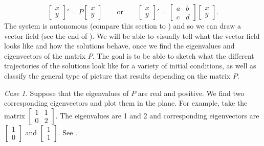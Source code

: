 \documentclass{ximera}
\begin{document}
\begin{equation} \label{pln:eq}
    \begin{bmatrix} 
        x \\ 
        y 
    \end{bmatrix} 
    ' = P 
    \begin{bmatrix} 
        x \\ 
        y 
    \end{bmatrix} 
    \qquad \text{or} \qquad
    \begin{bmatrix} 
        x \\ 
        y 
    \end{bmatrix} ' =
    \begin{bmatrix} 
        a & b \\ 
        c & d 
    \end{bmatrix} 
    \begin{bmatrix} 
        x \\ 
        y 
    \end{bmatrix}.
\end{equation}
The system is autonomous (compare this section to ) and so we can draw a vector field (see the end of ). We will be able to visually tell what the vector field looks like and how the solutions behave, once we find the eigenvalues and eigenvectors of the matrix $P$. The goal is to be able to sketch what the different trajectories of the solutions look like for a variety of initial conditions, as well as classify the general type of picture that results depending on the matrix $P$. 

\emph{Case 1.}  Suppose that the eigenvalues of $P$ are real and positive. We find two corresponding eigenvectors and plot them in the plane.  For example, take the matrix $\left[ \begin{smallmatrix} 1 & 1 \\ 0 & 2 \end{smallmatrix} \right]$. The eigenvalues are 1 and 2 and corresponding eigenvectors are $\left[ \begin{smallmatrix} 1 \\ 0 \end{smallmatrix} \right]$ and $\left[ \begin{smallmatrix} 1 \\ 1 \end{smallmatrix} \right]$.  See .
\end{document}
